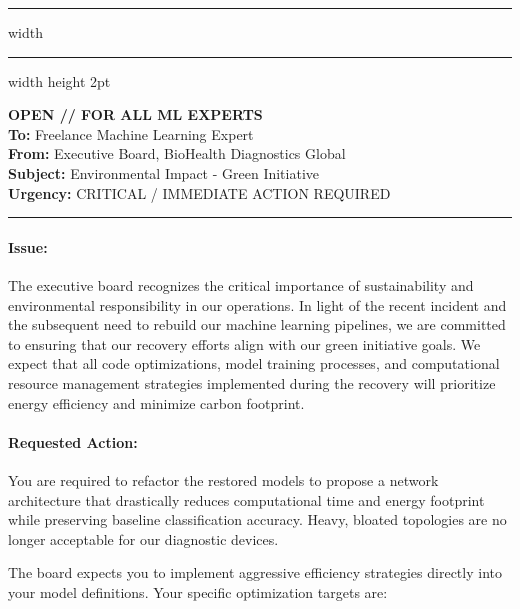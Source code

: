 \documentclass[11pt,a4paper]{article}
\begin{document}
\vspace{0.4cm}
\hrule width \hsize \kern 1mm \hrule width \hsize height 2pt 

\vspace{0.3cm}

\noindent \textbf{OPEN // FOR ALL ML EXPERTS} \\
\textbf{To:} Freelance Machine Learning Expert \\
\textbf{From:} Executive Board, BioHealth Diagnostics Global \\
\textbf{Subject:} Environmental Impact - Green Initiative \\
\textbf{Urgency:} CRITICAL / IMMEDIATE ACTION REQUIRED

\vspace{0.4cm}
\hrule

\paragraph{Issue:}
The executive board recognizes the critical importance of sustainability and environmental responsibility in our operations. In light of the recent incident and the subsequent need to rebuild our machine learning pipelines, we are committed to ensuring that our recovery efforts align with our green initiative goals. We expect that all code optimizations, model training processes, and computational resource management strategies implemented during the recovery will prioritize energy efficiency and minimize carbon footprint.

\vspace{-0.4cm}
\paragraph{Requested Action:}
You are required to refactor the restored models to propose a network architecture that drastically reduces computational time and energy footprint while preserving baseline classification accuracy. Heavy, bloated topologies are no longer acceptable for our diagnostic devices. 

The board expects you to implement aggressive efficiency strategies directly into your model definitions. Your specific optimization targets are:
\end{document}
